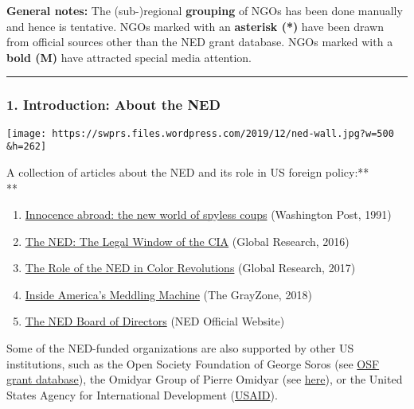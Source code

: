 \textbf{General notes:} The (sub-)regional \textbf{grouping} of NGOs has
been done manually and hence is tentative. NGOs marked with an
\textbf{asterisk (*)} have been drawn from official sources other than
the NED grant database. NGOs marked with a \textbf{bold (M)} have
attracted special media attention.

\begin{center}\rule{0.5\linewidth}{\linethickness}\end{center}

\hypertarget{1-introduction-about-the-ned}{%
\subsubsection{1. Introduction: About the
NED}\label{1-introduction-about-the-ned}}

\texttt{[image: https://swprs.files.wordpress.com/2019/12/ned-wall.jpg?w=500\\\&h=262]}

A collection of articles about the NED and its role in US foreign
policy:**\\
**

\begin{enumerate}
\def\labelenumi{\arabic{enumi}.}
\tightlist
\item
  \href{https://www.washingtonpost.com/archive/opinions/1991/09/22/innocence-abroad-the-new-world-of-spyless-coups/92bb989a-de6e-4bb8-99b9-462c76b59a16/}{Innocence
  abroad: the new world of spyless coups} (Washington Post, 1991)
\item
  \href{https://www.globalresearch.ca/the-national-endowment-for-democracy-ned-the-legal-window-of-the-cia/5542401}{The
  NED: The Legal Window of the CIA} (Global Research, 2016)
\item
  \href{https://www.globalresearch.ca/trojan-horses-and-color-revolutions-the-role-of-the-national-endowment-for-democracy-ned/5515234}{The
  Role of the NED in Color Revolutions} (Global Research, 2017)
\item
  \href{https://thegrayzone.com/2018/08/20/inside-americas-meddling-machine-the-us-funded-group-that-interferes-in-elections-around-the-globe/}{Inside
  America's Meddling Machine} (The GrayZone, 2018)
\item
  \href{https://www.ned.org/about/board-of-directors/}{The NED Board of
  Directors} (NED Official Website)
\end{enumerate}

Some of the NED-funded organizations are also supported by other US
institutions, such as the Open Society Foundation of George Soros (see
\href{https://www.opensocietyfoundations.org/grants/past}{OSF grant
database}), the Omidyar Group of Pierre Omidyar (see
\href{https://www.mintpressnews.com/ebay-founder-pierre-omidyar-is-funding-a-global-media-information-war/255199/}{here}),
or the United States Agency for International Development
(\href{https://en.wikipedia.org/wiki/United_States_Agency_for_International_Development}{USAID}).

